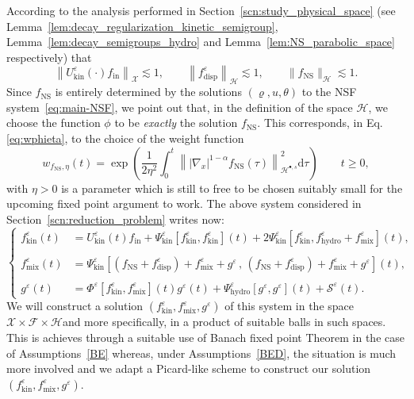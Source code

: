 \documentclass[10pt]{amsart}
\theoremstyle{definition}\newtheorem{defi}[theo]{Definition}\newtheorem{rema}[theo]{Remark}\newtheorem{exam}[theo]{Example}\newtheorem{exem}[theo]{Example}\newtheorem{nota}[theo]{Notation}
\newcommand{\ini}{\mathrm{in}}
\newcommand{\ns}{\mathrm{NS}}
\newcommand{\hyd}{\mathrm{hydro}}
\newcommand{\mix}{\mathrm{mix}}
\newcommand{\kin}{\mathrm{kin}}
\renewcommand{\d}{\mathrm{d}}
\newcommand{\disp}{\mathrm{disp}}
\newcommand{\HH}{\mathcal{H}}
\renewcommand{\SS}{\mathcal{S}}
\newcommand{\FFF}{\mathscr{F}}
\newcommand{\HHH}{\mathscr{H}}
\newcommand{\GGG}{\mathscr{X}}
\newcommand{\rSSsp}[1]{\HH^{{\bullet}, #1}}
\newcommand{\SSSs}{\HHH}
\newcommand{\SSSl}{\GGG}
\newcommand{\SSSm}{\FFF}
\renewcommand*\ge{\geqslant}
\newcommand*\eps{{\varepsilon}}
\begin{document}
According to the analysis performed in Section~\ref{scn:study_physical_space} (see Lemma~\ref{lem:decay_regularization_kinetic_semigroup}, Lemma~\ref{lem:decay_semigroups_hydro} and Lemma~\ref{lem:NS_parabolic_space} respectively) that
\[
\left\| U^\eps_\kin(\cdot) f_\ini \right\|_{\SSSl} \lesssim 1, \qquad \left\| f^\eps_\disp \right\|_{\SSSs} \lesssim 1, \qquad \| f_\ns \|_{\SSSs} \lesssim 1.
\]
Since $f_\ns$ is entirely determined by the solutions $(\varrho,u,\theta)$ to the NSF system~\eqref{eq:main-NSF}, we point out that, in the definition of the space $\SSSs$, we choose the function $\phi$ to be \emph{exactly} the solution $f_\ns$. This corresponds, in Eq. \eqref{eq:wphieta}, to the choice of the weight function
\[
w_{f_\ns,\eta}(t)=\exp\left(\frac{1}{2 \eta^2} \int_0^t \left\| |\nabla_x|^{1-\alpha} f_\ns(\tau) \right\|_{\rSSsp{s}}^2 \d \tau \right) \qquad t \ge0,
\]
with $\eta >0$ is a parameter which is still to free to be chosen {suitably small for the upcoming fixed point argument to work}. The above system considered in Section~\ref{scn:reduction_problem} writes now:
\begin{equation}\label{eq:systemKinMixG}
\begin{cases}
f^\eps_\kin(t) &= U^\eps_\kin(t) f_\ini + \Psi^\eps_\kin \left[f^\eps_\kin, f^\eps_\kin \right](t) + 2 \Psi^\eps_\kin\left[f^\eps_\kin, f^\eps_\hyd + f^\eps_\mix\right](t),\\
\\
f^\eps_\mix(t) &=\Psi^\eps_\kin\left[\left(f_\ns + f^\eps_\disp\right)+ f_\mix^\eps+g^\eps\,, \,\left(f_\ns + f^\eps_\disp\right)+ f_\mix^\eps+g^\eps \right](t),\\
\\
g^\eps(t) &= \Phi^\eps\left[f^\eps_\kin, f^\eps_\mix\right](t) g^\eps(t)+
\Psi^\eps_\hyd\left[g^\eps, g^\eps\right](t) + \SS^\eps(t).
\end{cases}
\end{equation}
We will construct a solution $(f^\eps_\kin, f^\eps_\mix, g^\eps)$ of this system in the space $ \SSSl \times \SSSm \times \SSSs $and more specifically, in a product of suitable balls in such spaces. This is achieves through a suitable use of Banach fixed point Theorem in the case of Assumptions~\eqref{BE} whereas, under Assumptions~\eqref{BED}, the situation is much more involved and we adapt a Picard-like scheme to construct our solution $(f^\eps_\kin,f^\eps_\mix,g^\eps)$. 
\end{document}
